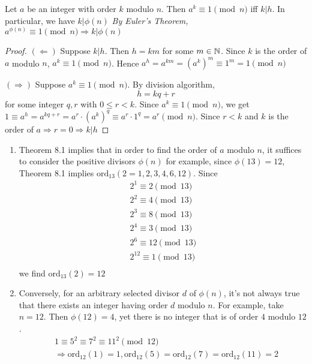 \begin{theorem}
    Let $a$ be an integer with order $k$ modulo $n$. Then $a^k \equiv 1 \pmod n$ 
    iff $k | h$. In particular, we have $k | \phi(n)$\newline
    \emph{By Euler's Theorem, $a^{\phi(n)} \equiv 1 \pmod n \Rightarrow k | \phi(n)$}

\end{theorem}
\begin{proof}
    $(\Leftarrow)$ Suppose $k|h$. Then $h = km$ for some $m \in \mathbb{N}$.
    Since $k$ is the order of $a$ modulo $n$, $a^k \equiv 1 \pmod n$.
    Hence $a^h = a^{km} = {(a^k)}^m \equiv 1^m = 1 \pmod n$

    $(\Rightarrow)$ Suppose $a^k \equiv 1 \pmod n$. By division algorithm,
    \[
        h = kq+r
    \]
    for some integer $q, r$ with $0 \leq r < k$. Since $a^k \equiv 1 \pmod n$, 
    we get $1 \equiv a^h = a^{kq+r} = a^r \cdot {(a^k)}^q \equiv a^r \cdot 1^q = a^r \pmod n$.
    Since $r < k$ and $k$ is the order of $a \Rightarrow r = 0 \Rightarrow k | h$
\end{proof}

\begin{remark}
    \begin{enumerate}
        \item Theorem 8.1 implies that in order to find the order of $a$ modulo $n$, it suffices to consider the positive divisors $\phi(n)$
        for example, since $\phi(13) = 12$, Theorem 8.1 implies $\text{ord}_{13}(2 = 1, 2, 3, 4, 6, 12)$. Since
        \[
            \begin{aligned}
                2^1 \equiv 2 \pmod {13} \\
                2^2 \equiv 4 \pmod {13} \\
                2^3 \equiv 8 \pmod {13} \\
                2^4 \equiv 3 \pmod {13} \\
                2^6 \equiv 12 \pmod {13} \\
                2^{12} \equiv 1 \pmod {13} \\
            \end{aligned}
        \] 
        we find $\text{ord}_{13}(2) = 12$

        \item Conversely, for an arbitrary selected divisor $d$ of $\phi(n)$, it's not always true
        that there exists an integer having order $d$ modulo $n$. For example, take $n = 12$.
        Then $\phi(12) = 4$, yet there is no integer that is of order $4$ modulo $12$.
        \[
            \begin{aligned}
                &1 \equiv 5^2 \equiv 7^2 \equiv 11^2 \pmod{12} \\
                &\Rightarrow \text{ord}_{12}(1) = 1, \text{ord}_{12}(5) = \text{ord}_{12}(7) = \text{ord}_{12}(11) = 2
            \end{aligned}
        \]
    \end{enumerate}
\end{remark}


